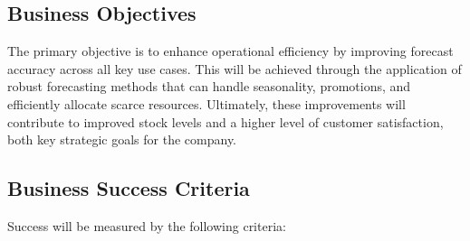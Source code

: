 \documentclass[
  american,
  10,
  a4paper,
]{book}
\theoremstyle{definition}
\theoremstyle{remark}
\begin{document}
\subsection{Business Objectives}\label{business-objectives}

The primary objective is to enhance operational efficiency by improving
forecast accuracy across all key use cases. This will be achieved
through the application of robust forecasting methods that can handle
seasonality, promotions, and efficiently allocate scarce resources.
Ultimately, these improvements will contribute to improved stock levels
and a higher level of customer satisfaction, both key strategic goals
for the company.

\subsection{Business Success Criteria}\label{business-success-criteria}

Success will be measured by the following criteria:
\end{document}
